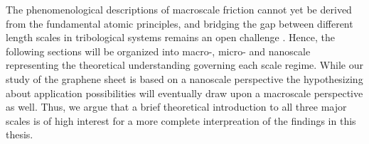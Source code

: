 The phenomenological descriptions of macroscale friction cannot yet be derived from the fundamental atomic principles, and bridging the gap between different length scales in tribological systems remains an open challenge \cite{Manini_2016}. Hence, the following sections will be organized into macro-, micro- and nanoscale representing the theoretical understanding governing each scale regime. While our study of the graphene sheet is based on a nanoscale perspective the hypothesizing about application possibilities will eventually draw upon a macroscale perspective as well. Thus, we argue that a brief theoretical introduction to all three major scales is of high interest for a more complete interpreation of the findings in this thesis. 









